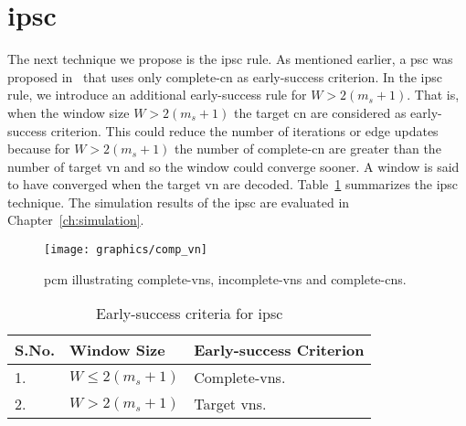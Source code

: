 \section{\acl{ipsc}}
The next technique we propose is the \ac{ipsc} rule. As mentioned earlier, a \ac{psc} was proposed in~\cite{Kang2018} that uses only complete-\ac{cn} as early-success criterion. In the \ac{ipsc} rule, we introduce an additional early-success rule for $W>2(m_s+1)$. That is, when the window size $W>2(m_s+1)$ the target \ac{cn} are considered as early-success criterion. This could reduce the number of iterations or edge updates because for $W>2(m_s+1)$ the number of complete-\ac{cn} are greater than the number of target \ac{vn} and so the window could converge sooner. A window is said to have converged when the target \ac{vn} are decoded. Table~\ref{tab:ipsc} summarizes the \ac{ipsc} technique. The simulation results of the \ac{ipsc} are evaluated in Chapter~\ref{ch:simulation}.
\begin{figure}[htbp]
  \centering
  \texttt{[image: graphics/comp\_vn]}
  \caption{\ac{pcm} illustrating complete-\acp{vn}, incomplete-\acp{vn} and complete-\acp{cn}.}
  \label{fig:comp_vn}
\end{figure}

\begin{table}[htbp]
\centering
\begin{tabular}{|l|l|l|}
  \hline
  \textbf{S.No.} &\textbf{Window Size} &\textbf{Early-success Criterion}\\
  \hline
  \hline
  1. &$W\leq2(m_s+1)$ &Complete-\acp{vn}.\\
  \hline
  2. &$W>2(m_s+1)$ &Target \acp{vn}.\\
  \hline
\end{tabular}
\caption{Early-success criteria for \ac{ipsc}}
\label{tab:ipsc}
\end{table}